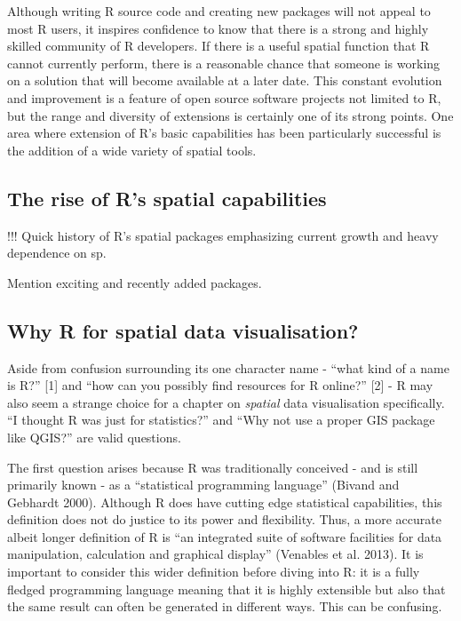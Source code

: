 \documentclass[]{article}
\begin{document}
Although writing R source code and creating new packages will not appeal
to most R users, it inspires confidence to know that there is a strong
and highly skilled community of R developers. If there is a useful
spatial function that R cannot currently perform, there is a reasonable
chance that someone is working on a solution that will become available
at a later date. This constant evolution and improvement is a feature of
open source software projects not limited to R, but the range and
diversity of extensions is certainly one of its strong points. One area
where extension of R's basic capabilities has been particularly
successful is the addition of a wide variety of spatial tools.

\subsection{The rise of R's spatial capabilities}

!!! Quick history of R's spatial packages emphasizing current growth and
heavy dependence on sp.

Mention exciting and recently added packages.

\subsection{Why R for spatial data visualisation?}

Aside from confusion surrounding its one character name - ``what kind of
a name is R?'' {[}1{]} and ``how can you possibly find resources for R
online?'' {[}2{]} - R may also seem a strange choice for a chapter on
\emph{spatial} data visualisation specifically. ``I thought R was just
for statistics?'' and ``Why not use a proper GIS package like QGIS?''
are valid questions.

The first question arises because R was traditionally conceived - and is
still primarily known - as a ``statistical programming language''
(Bivand and Gebhardt 2000). Although R does have cutting edge
statistical capabilities, this definition does not do justice to its
power and flexibility. Thus, a more accurate albeit longer definition of
R is ``an integrated suite of software facilities for data manipulation,
calculation and graphical display'' (Venables et al. 2013). It is
important to consider this wider definition before diving into R: it is
a fully fledged programming language meaning that it is highly
extensible but also that the same result can often be generated in
different ways. This can be confusing.
\end{document}
